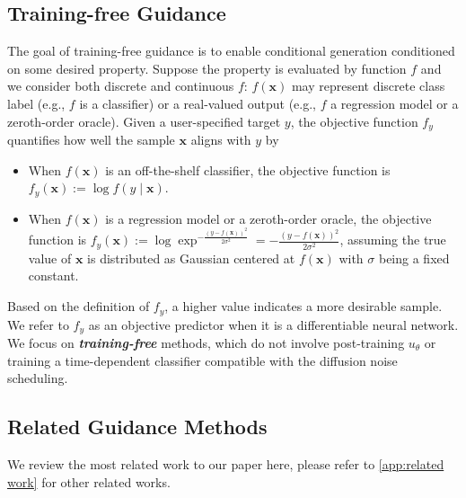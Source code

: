 \subsection{Training-free Guidance} 
The goal of training-free guidance is to enable conditional generation conditioned on some desired property. Suppose the property is evaluated by function $f$ and we consider both discrete and continuous $f$: $f(\boldsymbol{x})$ may represent discrete class label (e.g., $f$ is a classifier) or a real-valued output (e.g., $f$ a regression model or a zeroth-order oracle). Given a user-specified target $y$, the objective function $f_y$ quantifies how well the sample $ \boldsymbol{x}$ aligns with $y$ by
\begin{itemize}[itemsep=0pt, parsep=0pt, topsep=0pt]
    \item When $f(\boldsymbol{x})$ is an off-the-shelf classifier, the objective function is $f_y(\boldsymbol{x}) := \log f(y\mid \boldsymbol{x})$.
    \item When $f(\boldsymbol{x})$ is a regression model or a zeroth-order oracle, the objective function is $f_y(\boldsymbol{x}):= \log \exp^{-\frac{(y-f(\boldsymbol{x}))^2}{2\sigma^2}} = -\frac{(y-f(\boldsymbol{x}))^2}{2\sigma^2}$, assuming the true value of $\boldsymbol{x}$ is distributed as Gaussian centered at $f(\boldsymbol{x})$ with $\sigma$ being a fixed constant.
\end{itemize}
Based on the definition of $f_y$, a higher value indicates a more desirable sample. We refer to $f_y$ as an objective predictor when it is a differentiable neural network.
We focus on \emph{\textbf{training-free}} methods, which do not involve post-training $u_{\theta}$ or training a time-dependent classifier compatible with the diffusion noise scheduling.



\subsection{Related Guidance Methods} We review the most related work to our paper here, please refer to \cref{app:related work} for other related works. 

